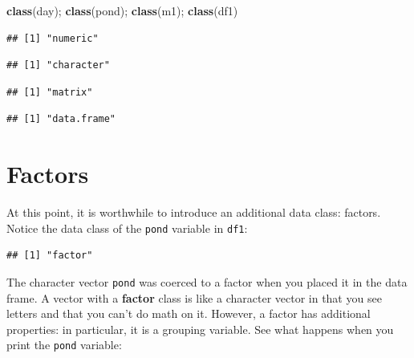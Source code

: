 \documentclass[]{book}
\newenvironment{Shaded}{\begin{snugshade}}{\end{snugshade}}
\newcommand{\KeywordTok}[1]{\textcolor[rgb]{0.13,0.29,0.53}{\textbf{#1}}}
\newcommand{\NormalTok}[1]{#1}
\newcommand{\OperatorTok}[1]{\textcolor[rgb]{0.81,0.36,0.00}{\textbf{#1}}}
\begin{document}
\begin{Shaded}
\begin{Highlighting}[]
\KeywordTok{class}\NormalTok{(day); }\KeywordTok{class}\NormalTok{(pond); }\KeywordTok{class}\NormalTok{(m1); }\KeywordTok{class}\NormalTok{(df1)}
\end{Highlighting}
\end{Shaded}

\begin{verbatim}
## [1] "numeric"
\end{verbatim}

\begin{verbatim}
## [1] "character"
\end{verbatim}

\begin{verbatim}
## [1] "matrix"
\end{verbatim}

\begin{verbatim}
## [1] "data.frame"
\end{verbatim}

\hypertarget{factors}{%
\section{Factors}\label{factors}}

At this point, it is worthwhile to introduce an additional data class: factors. Notice the data class of the \texttt{pond} variable in \texttt{df1}:

\begin{Shaded}
\end{Shaded}

\begin{verbatim}
## [1] "factor"
\end{verbatim}

The character vector \texttt{pond} was coerced to a factor when you placed it in the data frame. A vector with a \textbf{factor} class is like a character vector in that you see letters and that you can't do math on it. However, a factor has additional properties: in particular, it is a grouping variable. See what happens when you print the \texttt{pond} variable:

\begin{Shaded}
\end{Shaded}
\end{document}
